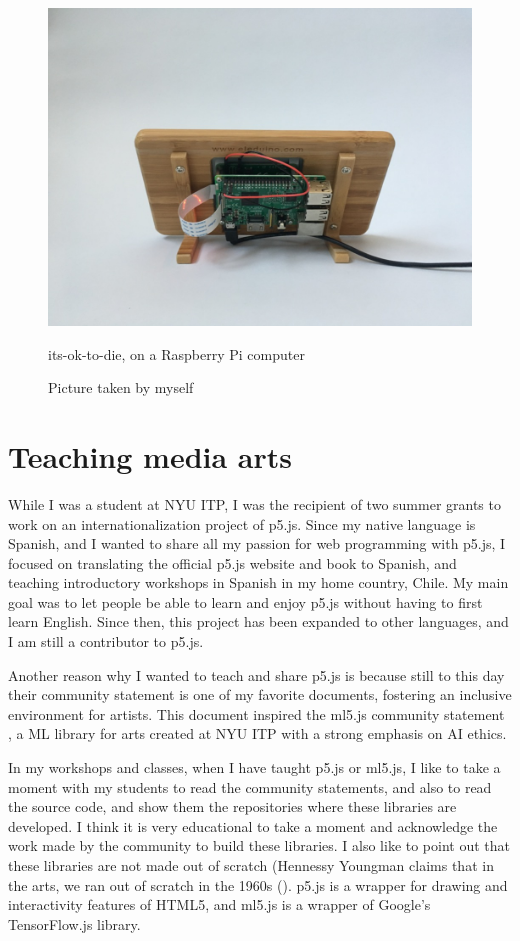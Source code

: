 \begin{figure}[ht]
  \centering
  \includegraphics[width=0.75\linewidth,height=0.35\textheight,keepaspectratio]{images/its-ok-to-die-raspberry.jpg}
  \caption{its-ok-to-die, on a Raspberry Pi computer}
  \caption*{Picture taken by myself}
  \label{fig:its-ok-to-die-raspberry}
\end{figure}

\section{Teaching media arts}

While I was a student at \acrshort{NYU} \acrshort{ITP}, I was the recipient of two summer grants to work on an internationalization project of p5.js. Since my native language is Spanish, and I wanted to share all my passion for web programming with p5.js, I focused on translating the official p5.js website \cite{website-p5js-spanish} and book \cite{p5js-spanish-book} to Spanish, and teaching introductory workshops in Spanish in my home country, Chile. My main goal was to let people be able to learn and enjoy p5.js without having to first learn English. Since then, this project has been expanded to other languages, and I am still a contributor to p5.js.

Another reason why I wanted to teach and share p5.js is because still to this day their community statement \cite{website-p5js-community-statement} is one of my favorite documents, fostering an inclusive environment for artists. This document inspired the ml5.js community statement \cite{website-ml5js-community-statement}, a \acrshort{ML} library for arts created at \acrshort{NYU} \acrshort{ITP} with a strong emphasis on \acrshort{AI} ethics.

In my workshops and classes, when I have taught p5.js or ml5.js, I like to take a moment with my students to read the community statements, and also to read the source code, and show them the repositories where these libraries are developed. I think it is very educational to take a moment and acknowledge the work made by the community to build these libraries. I also like to point out that these libraries are not made out of scratch (Hennessy Youngman claims that in the arts, we ran out of scratch in the 1960s (\cite{hennessy-youngman-art-thoughtz-how-to-make-an-art}). p5.js is a wrapper for drawing and interactivity features of HTML5, and ml5.js is a wrapper of Google's TensorFlow.js library.

